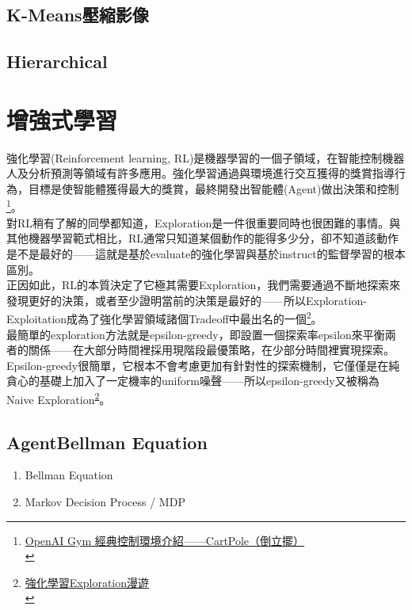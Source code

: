 \documentclass[a4paper,12pt]{article}
\begin{document}
\subsection{K-Means壓縮影像}
\label{sec:org71dbfe8}
\subsection{Hierarchical}
\label{sec:org85c00b7}
\newpage

\section{增強式學習}
\label{sec:orgf1e2947}
強化學習(Reinforcement learning, RL)是機器學習的一個子領域，在智能控制機器人及分析預測等領域有許多應用。強化學習通過與環境進行交互獲得的獎賞指導行為，目標是使智能體獲得最大的獎賞，最終開發出智能體(Agent)做出決策和控制\footnote{\href{https://blog.csdn.net/qq\_32892383/article/details/89576003}{OpenAI Gym 經典控制環境介紹——CartPole（倒立擺）}\\}。\\

對RL稍有了解的同學都知道，Exploration是一件很重要同時也很困難的事情。與其他機器學習範式相比，RL通常只知道某個動作的能得多少分，卻不知道該動作是不是最好的——這就是基於evaluate的強化學習與基於instruct的監督學習的根本區別。\\

正因如此，RL的本質決定了它極其需要Exploration，我們需要通過不斷地探索來發現更好的決策，或者至少證明當前的決策是最好的——所以Exploration-Exploitation成為了強化學習領域諸個Tradeoff中最出名的一個\footnote{\href{https://kknews.cc/zh-tw/news/34mob53.html}{強化學習Exploration漫遊}\\\label{org0d3d039}}。\\

最簡單的exploration方法就是epsilon-greedy，即設置一個探索率epsilon來平衡兩者的關係——在大部分時間裡採用現階段最優策略，在少部分時間裡實現探索。\\

Epsilon-greedy很簡單，它根本不會考慮更加有針對性的探索機制，它僅僅是在純貪心的基礎上加入了一定機率的uniform噪聲——所以epsilon-greedy又被稱為Naive Exploration\textsuperscript{\ref{org0d3d039}}。\\
\subsection{AgentBellman Equation}
\label{sec:org046ae49}
\newpage
\begin{enumerate}
\item Bellman Equation
\label{sec:org85630f3}
\item Markov Decision Process / MDP
\label{sec:orga4757e5}
\end{enumerate}
\end{document}
